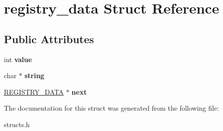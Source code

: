 \hypertarget{structregistry__data}{\section{registry\-\_\-data Struct Reference}
\label{structregistry__data}
}
\subsection*{Public Attributes}
\begin{DoxyCompactItemize}
\item 
\hypertarget{structregistry__data_aa6a3b25fc21926bb3cc42575706f9e94}{int {\bfseries value}}\label{structregistry__data_aa6a3b25fc21926bb3cc42575706f9e94}

\item 
\hypertarget{structregistry__data_a10a80c5a1f3cdf3d22528c76e8cdad7a}{char $\ast$ {\bfseries string}}\label{structregistry__data_a10a80c5a1f3cdf3d22528c76e8cdad7a}

\item 
\hypertarget{structregistry__data_a74fd1cf4f25dac4d6895ef61a050e465}{\hyperlink{structregistry__data}{R\-E\-G\-I\-S\-T\-R\-Y\-\_\-\-D\-A\-T\-A} $\ast$ {\bfseries next}}\label{structregistry__data_a74fd1cf4f25dac4d6895ef61a050e465}

\end{DoxyCompactItemize}


The documentation for this struct was generated from the following file\-:\begin{DoxyCompactItemize}
\item 
structs.\-h\end{DoxyCompactItemize}
